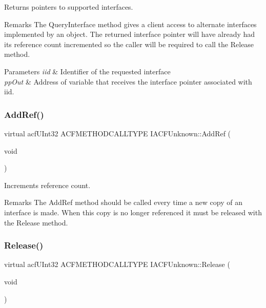 Returns pointers to supported interfaces. 

\begin{DoxyRemark}{Remarks}
The Query\+Interface method gives a client access to alternate interfaces implemented by an object. The returned interface pointer will have already had its reference count incremented so the caller will be required to call the Release method. 
\end{DoxyRemark}

\begin{DoxyParams}{Parameters}
{\em iid} & Identifier of the requested interface \\
\hline
{\em pp\+Out} & Address of variable that receives the interface pointer associated with iid. \\
\hline
\end{DoxyParams}
\mbox{\label{a01409_aa9c7a5b9dff341092b7b86bb9b3a58fb}} 
\subsubsection{\texorpdfstring{AddRef()}{AddRef()}}
{\footnotesize\ttfamily virtual acf\+U\+Int32 A\+C\+F\+M\+E\+T\+H\+O\+D\+C\+A\+L\+L\+T\+Y\+PE I\+A\+C\+F\+Unknown\+::\+Add\+Ref (\begin{DoxyParamCaption}\item[{void}]{ }\end{DoxyParamCaption})\hspace{0.3cm}{\ttfamily [pure virtual]}}



Increments reference count. 

\begin{DoxyRemark}{Remarks}
The Add\+Ref method should be called every time a new copy of an interface is made. When this copy is no longer referenced it must be released with the Release method. 
\end{DoxyRemark}
\mbox{\label{a01409_afabd38cec0a9ed37f1d3e8644a70ac41}} 
\subsubsection{\texorpdfstring{Release()}{Release()}}
{\footnotesize\ttfamily virtual acf\+U\+Int32 A\+C\+F\+M\+E\+T\+H\+O\+D\+C\+A\+L\+L\+T\+Y\+PE I\+A\+C\+F\+Unknown\+::\+Release (\begin{DoxyParamCaption}\item[{void}]{ }\end{DoxyParamCaption})\hspace{0.3cm}{\ttfamily [pure virtual]}}



